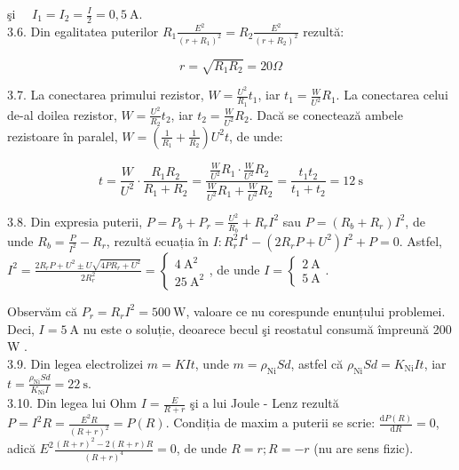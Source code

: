 şi $\quad I_{1}=I_{2}=\frac{I}{2}=0,5 \mathrm{~A}$.\\
3.6. Din egalitatea puterilor $R_{1} \frac{E^{2}}{\left(r+R_{1}\right)^{2}}=R_{2} \frac{E^{2}}{\left(r+R_{2}\right)^{2}}$ rezultă:

$$
r=\sqrt{R_{1} R_{2}}=20 \Omega
$$

3.7. La conectarea primului rezistor, $W=\frac{U^{2}}{R_{1}} t_{1}$, iar $t_{1}=\frac{W}{U^{2}} R_{1}$. La conectarea celui de-al doilea rezistor, $W=\frac{U^{2}}{R_{2}} t_{2}$, iar $t_{2}=\frac{W}{U^{2}} R_{2}$. Dacă se conectează ambele rezistoare în paralel, $W=\left(\frac{1}{R_{1}}+\frac{1}{R_{2}}\right) U^{2} t$, de unde:

$$
t=\frac{W}{U^{2}} \cdot \frac{R_{1} R_{2}}{R_{1}+R_{2}}=\frac{\frac{W}{U^{2}} R_{1} \cdot \frac{W}{U^{2}} R_{2}}{\frac{W}{U^{2}} R_{1}+\frac{W}{U^{2}} R_{2}}=\frac{t_{1} t_{2}}{t_{1}+t_{2}}=12 \mathrm{~s}
$$

3.8. Din expresia puterii, $P=P_{b}+P_{r}=\frac{U^{2}}{R_{b}}+R_{r} I^{2}$ sau $P=\left(R_{b}+R_{r}\right) I^{2}$, de unde $R_{b}=\frac{P}{I^{2}}-R_{r}$, rezultă ecuația în $I: R_{r}^{2} I^{4}-\left(2 R_{r} P+U^{2}\right) I^{2}+P=0$. Astfel, $I^{2}=\frac{2 R_{r} P+U^{2} \pm U \sqrt{4 P R_{r}+U^{2}}}{2 R_{r}^{2}}=\left\{\begin{array}{l}4 \mathrm{~A}^{2} \\ 25 \mathrm{~A}^{2}\end{array}\right.$, de unde $I=\left\{\begin{array}{l}2 \mathrm{~A} \\ 5 \mathrm{~A}\end{array}\right.$.

Observăm că $P_{r}=R_{r} I^{2}=500 \mathrm{~W}$, valoare ce nu corespunde enunțului problemei. Deci, $I=5 \mathrm{~A}$ nu este o soluție, deoarece becul şi reostatul consumă împreună 200 W .\\
3.9. Din legea electrolizei $m=K I t$, unde $m=\rho_{\mathrm{Ni}} S d$, astfel că $\rho_{\mathrm{Ni}} S d=K_{\mathrm{Ni}} I t$, iar $t=\frac{\rho_{\mathrm{Ni}} S d}{K_{\mathrm{Ni}} I}=22 \mathrm{~s}$.\\
3.10. Din legea lui Ohm $I=\frac{E}{R+r}$ şi a lui Joule - Lenz rezultă $P=I^{2} R=\frac{E^{2} R}{(R+r)^{2}}=P(R)$. Condiția de maxim a puterii se scrie: $\frac{\mathrm{d} P(R)}{\mathrm{d} R}=0$, adică $E^{2} \frac{(R+r)^{2}-2(R+r) R}{(R+r)^{4}}=0$, de unde $R=r ; R=-r$ (nu are sens fizic).

